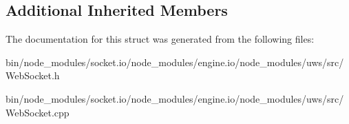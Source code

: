 \subsection*{Additional Inherited Members}


The documentation for this struct was generated from the following files\+:\begin{DoxyCompactItemize}
\item 
bin/node\+\_\+modules/socket.\+io/node\+\_\+modules/engine.\+io/node\+\_\+modules/uws/src/Web\+Socket.\+h\item 
bin/node\+\_\+modules/socket.\+io/node\+\_\+modules/engine.\+io/node\+\_\+modules/uws/src/Web\+Socket.\+cpp\end{DoxyCompactItemize}
